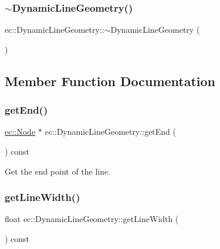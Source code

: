 \subsubsection{\texorpdfstring{$\sim$\+Dynamic\+Line\+Geometry()}{~DynamicLineGeometry()}}
{\footnotesize\ttfamily ec\+::\+Dynamic\+Line\+Geometry\+::$\sim$\+Dynamic\+Line\+Geometry (\begin{DoxyParamCaption}{ }\end{DoxyParamCaption})\hspace{0.3cm}{\ttfamily [default]}}



\subsection{Member Function Documentation}
\mbox{\label{classec_1_1_dynamic_line_geometry_a877ec687c19743cc67520b5a419bad74}} 
\subsubsection{\texorpdfstring{get\+End()}{getEnd()}}
{\footnotesize\ttfamily \mbox{\hyperlink{classec_1_1_node}{ec\+::\+Node}} $\ast$ ec\+::\+Dynamic\+Line\+Geometry\+::get\+End (\begin{DoxyParamCaption}{ }\end{DoxyParamCaption}) const}



Get the end point of the line. 

\mbox{\label{classec_1_1_dynamic_line_geometry_a0b32e465ad6a232b96dc3a0cd404ae62}} 
\subsubsection{\texorpdfstring{get\+Line\+Width()}{getLineWidth()}}
{\footnotesize\ttfamily float ec\+::\+Dynamic\+Line\+Geometry\+::get\+Line\+Width (\begin{DoxyParamCaption}{ }\end{DoxyParamCaption}) const}



